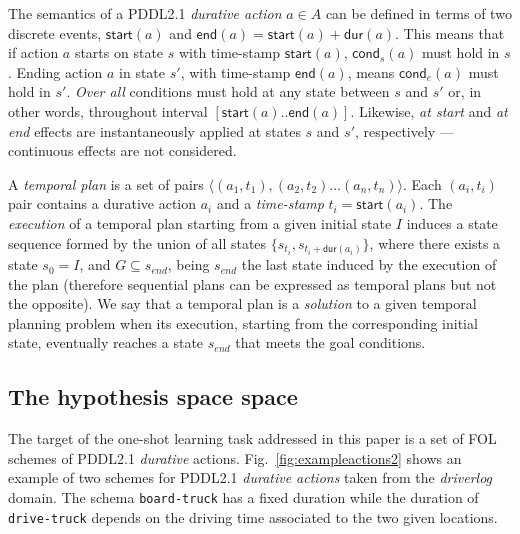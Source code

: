 \documentclass{ecai}
\newcommand{\tup}[1]{{\langle #1 \rangle}}
\newcommand{\cond}{\mathsf{cond}}  %
\newcommand{\dur}{\mathsf{dur}}    %
\newcommand{\start}{\mathsf{start}}%
\newcommand{\en}{\mathsf{end}}     %
\begin{document}
The semantics of a PDDL2.1 {\em durative action} $a\in A$ can be defined in terms of two discrete events, $\start(a)$ and $\en(a)=\start(a)+\dur(a)$. This means that if action $a$ starts on state $s$ with time-stamp $\start(a)$, $\cond_s(a)$ must hold in $s$. Ending action $a$ in state $s'$, with time-stamp $\en(a)$, means $\cond_e(a)$ must hold in $s'$. {\em Over all} conditions must hold at any state between $s$ and $s'$ or, in other words, throughout interval $[\start(a)..\en(a)]$. Likewise, {\em at start} and {\em at end} effects are instantaneously applied at states $s$ and $s'$, respectively ---continuous effects are not considered. 

A {\em temporal plan} is a set of pairs $\tup{(a_1,t_1),(a_2,t_2)\ldots (a_n,t_n)}$. Each $(a_i,t_i)$ pair contains a durative action $a_i$ and a {\em time-stamp} $t_i=\start(a_i)$. The {\em execution} of a temporal plan starting from a given initial state $I$ induces a state sequence formed by the union of all states $\{s_{t_i}, s_{t_i+\dur(a_i)}\}$, where there exists a state $s_{0}=I$, and $G\subseteq s_{end}$, being $s_{end}$ the last state induced by the execution of the plan (therefore sequential plans can be expressed as temporal plans but not the opposite). We say that a temporal plan is a {\em solution} to a given temporal planning problem when its execution, starting from the corresponding initial state, eventually reaches a state $s_{end}$ that meets the goal conditions.

\subsection{The hypothesis space space}
\label{sec:action-space}
The target of the one-shot learning task addressed in this paper is a set of FOL schemes of PDDL2.1 {\em durative} actions. Fig.~\ref{fig:exampleactions2} shows an example of two schemes for PDDL2.1 {\em durative actions} taken from the {\em driverlog} domain. The schema \texttt{board-truck} has a fixed duration while the duration of \texttt{drive-truck} depends on the driving time associated to the two given locations.
\end{document}
